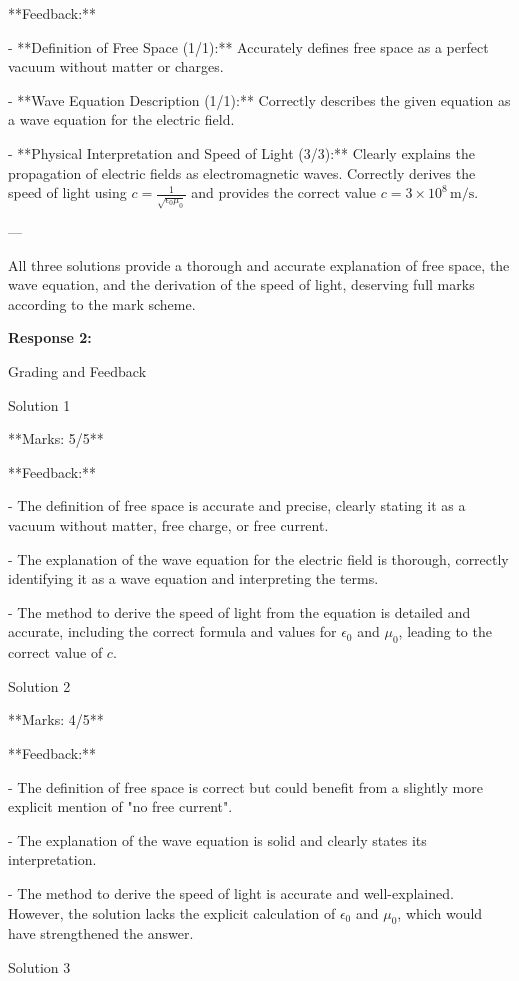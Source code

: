 \documentclass[a4paper,11pt]{article}
\begin{document}
**Feedback:**

- **Definition of Free Space (1/1):** Accurately defines free space as a perfect vacuum without matter or charges.

- **Wave Equation Description (1/1):** Correctly describes the given equation as a wave equation for the electric field.

- **Physical Interpretation and Speed of Light (3/3):** Clearly explains the propagation of electric fields as electromagnetic waves. Correctly derives the speed of light using \( c = \frac{1}{\sqrt{\epsilon_{0}\mu_{0}}} \) and provides the correct value \( c = 3 \times 10^8 \, \text{m/s} \).

---

All three solutions provide a thorough and accurate explanation of free space, the wave equation, and the derivation of the speed of light, deserving full marks according to the mark scheme.

\bigskip    
\textbf{Response 2:}

Grading and Feedback

Solution 1

**Marks: 5/5**

**Feedback:**

- The definition of free space is accurate and precise, clearly stating it as a vacuum without matter, free charge, or free current.

- The explanation of the wave equation for the electric field is thorough, correctly identifying it as a wave equation and interpreting the terms.

- The method to derive the speed of light from the equation is detailed and accurate, including the correct formula and values for \(\epsilon_{0}\) and \(\mu_{0}\), leading to the correct value of \(c\).

Solution 2

**Marks: 4/5**

**Feedback:**

- The definition of free space is correct but could benefit from a slightly more explicit mention of "no free current".

- The explanation of the wave equation is solid and clearly states its interpretation.

- The method to derive the speed of light is accurate and well-explained. However, the solution lacks the explicit calculation of \(\epsilon_{0}\) and \(\mu_{0}\), which would have strengthened the answer.

Solution 3
\end{document}
